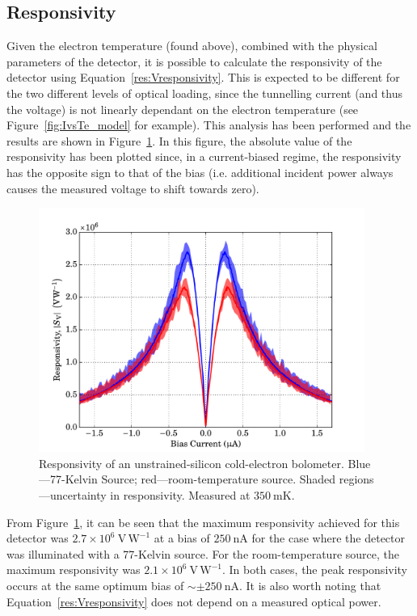 \subsection{Responsivity}\label{ssec:opticalControlSi_responsivity}
Given the electron temperature (found above), combined with the physical parameters of the detector, it is possible to calculate the responsivity of the detector using Equation~\ref{res:Vresponsivity}. This is expected to be different for the two different levels of optical loading, since the tunnelling current (and thus the voltage) is not linearly dependant on the electron temperature (see Figure~\ref{fig:IvsTe_model} for example). This analysis has been performed and the results are shown in Figure~\ref{fig:controlResponsivity}. In this figure, the absolute value of the responsivity has been plotted since, in a current-biased regime, the responsivity has the opposite sign to that of the bias (i.e. additional incident power always causes the measured voltage to shift towards zero).
\begin{figure}[tb]
\begin{center}
\includegraphics[width = 0.95\textwidth]{figures/control_responsivity}
\caption[Responsivity of an unstrained-\gls{acr:SiCEB}]{Responsivity of an unstrained-silicon cold-electron bolometer. Blue---77-Kelvin Source; red---room-temperature source. Shaded regions---uncertainty in responsivity. Measured at $350~\mathrm{mK}$.}
\label{fig:controlResponsivity}
\end{center}
\end{figure}
\par 
From Figure~\ref{fig:controlResponsivity}, it can be seen that the maximum responsivity achieved for this detector was $2.7 \times 10^{6}~\mathrm{V\,W^{-1}}$ at a bias of $250~\mathrm{nA}$ for the case where the detector was illuminated with a 77-Kelvin source. For the room-temperature source, the maximum responsivity was $2.1 \times 10^{6}~\mathrm{V\,W^{-1}}$. In both cases, the peak responsivity occurs at the same optimum bias of $\sim \pm 250~\mathrm{nA}$. It is also worth noting that Equation~\ref{res:Vresponsivity} does not depend on a measured optical power.
